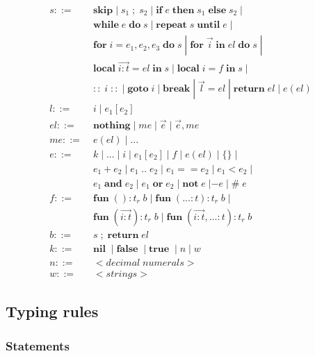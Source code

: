 \documentclass[12pt]{article}
\newcommand{\pipe}{|\;}
\newcommand{\kw}[1]{\mathbf{#1} \;}
\begin{document}
\begin{align*}
s ::= \; & \kw{skip} \pipe s_{1} \;;\; s_{2} \; \pipe
\kw{if} e \; \kw{then} s_{1} \; \kw{else} s_{2} \; \pipe\\
& \kw{while} e \; \kw{do} s \; \pipe
\kw{repeat} s \; \kw{until} e \; \pipe\\
& \kw{for} i=e_{1},e_{2},e_{3} \; \kw{do} s \; \pipe
\kw{for} \vec{i} \; \kw{in} el \; \kw{do} s \; \pipe\\
& \kw{local} \overrightarrow{i:t} = el \; \kw{in} s \; \pipe
\kw{local} i = f \; \kw{in} s \; \pipe\\
& \kw{::} i \; \kw{::} \pipe \kw{goto} i \; \pipe \kw{break} \pipe
\vec{l} = el \; \pipe \kw{return} el \; \pipe e(el)\\
l ::= \; & i \; \pipe e_{1}[e_{2}]\\
el ::= \; & \kw{nothing} \pipe me \; \pipe \vec{e} \; \pipe \vec{e},me\\
me ::= \; & e(el) \; \pipe {...}\\
e ::= \; & k \; \pipe {...} \; \pipe i \; \pipe e_{1}[e_{2}] \; \pipe
f \; \pipe e(el) \; \pipe \{\} \; \pipe\\
& e_{1} + e_{2} \; \pipe e_{1} \; {..} \; e_{2} \; \pipe
e_{1} == e_{2} \; \pipe e_{1} < e_{2} \; \pipe\\
& e_{1} \; \kw{and} e_{2} \; \pipe e_{1} \; \kw{or} e_{2} \; \pipe
\kw{not} e \; | - e \; \pipe \# \; e\\
f ::= \; & \kw{fun} ():t_{r} \; b \; \pipe
\kw{fun} ({...}:t):t_{r} \; b \; \pipe\\
& \kw{fun} (\overrightarrow{i:t}):t_{r} \; b \; \pipe
\kw{fun} (\overrightarrow{i:t},{...}:t):t_{r} \; b\\
b ::= \; & s \;;\; \kw{return} el\\
k ::= \; & \kw{nil} \; \pipe \kw{false} \; \pipe \kw{true} \; \pipe
n \; \pipe w\\
n ::= \; & {<}decimal\;numerals{>}\\
w ::= \; & {<}strings{>}
\end{align*}

\subsection{Typing rules}

\subsubsection{Statements}
\end{document}
